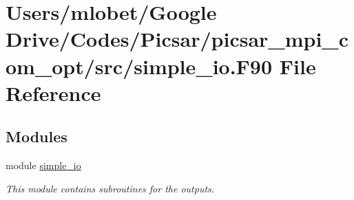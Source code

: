 \hypertarget{simple__io_8_f90}{}\section{Users/mlobet/\+Google Drive/\+Codes/\+Picsar/picsar\+\_\+mpi\+\_\+com\+\_\+opt/src/simple\+\_\+io.F90 File Reference}
\label{simple__io_8_f90}
\subsection*{Modules}
\begin{DoxyCompactItemize}
\item 
module \hyperlink{namespacesimple__io}{simple\+\_\+io}
\begin{DoxyCompactList}\small\item\em This module contains subroutines for the outputs. \end{DoxyCompactList}\end{DoxyCompactItemize}
